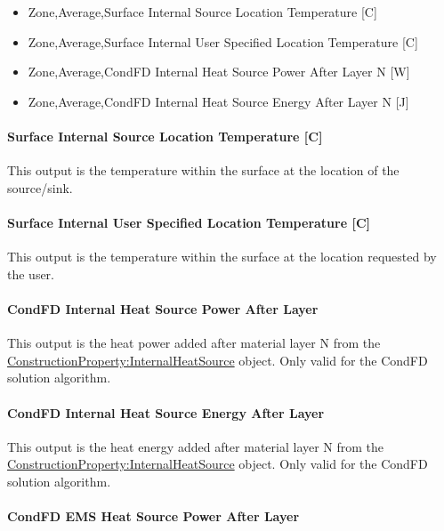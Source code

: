 \begin{itemize}
\item  Zone,Average,Surface Internal Source Location Temperature [C]
\item  Zone,Average,Surface Internal User Specified Location Temperature [C]
\item  Zone,Average,CondFD Internal Heat Source Power After Layer N [W]
\item  Zone,Average,CondFD Internal Heat Source Energy After Layer N [J]
\end{itemize}

\paragraph{Surface Internal Source Location Temperature {[}C{]}}\label{surface-internal-source-location-temperature-c}

This output is the temperature within the surface at the location of the source/sink.

\paragraph{Surface Internal User Specified Location Temperature {[}C{]}}\label{surface-internal-user-specified-location-temperature-c}

This output is the temperature within the surface at the location requested by the user.

\paragraph{CondFD Internal Heat Source Power After Layer}

This output is the heat power added after material layer N from the \hyperref[constructioninternalsource]{ConstructionProperty:InternalHeatSource} object. Only valid for the CondFD solution algorithm.

\paragraph{CondFD Internal Heat Source Energy After Layer}

This output is the heat energy added after material layer N from the \hyperref[constructioninternalsource]{ConstructionProperty:InternalHeatSource} object. Only valid for the CondFD solution algorithm.

\paragraph{CondFD EMS Heat Source Power After Layer}


